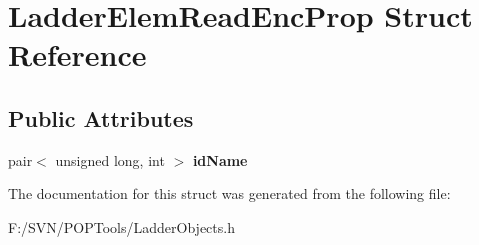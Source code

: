 \hypertarget{struct_ladder_elem_read_enc_prop}{\section{Ladder\-Elem\-Read\-Enc\-Prop Struct Reference}
\label{struct_ladder_elem_read_enc_prop}
}
\subsection*{Public Attributes}
\begin{DoxyCompactItemize}
\item 
\hypertarget{struct_ladder_elem_read_enc_prop_a0448fda3433e237646f9732103af358d}{pair$<$ unsigned long, int $>$ {\bfseries id\-Name}}\label{struct_ladder_elem_read_enc_prop_a0448fda3433e237646f9732103af358d}

\end{DoxyCompactItemize}


The documentation for this struct was generated from the following file\-:\begin{DoxyCompactItemize}
\item 
F\-:/\-S\-V\-N/\-P\-O\-P\-Tools/Ladder\-Objects.\-h\end{DoxyCompactItemize}
